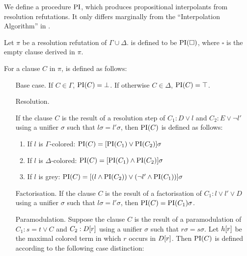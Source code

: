 We define a procedure $\operatorname{PI}$, which produces propositional interpolants from resolution refutations. It only differs marginally from the ``Interpolation Algorithm'' in \cite{Huang95}.
\begin{defi}
	Let $\pi$ be a resolution refutation of $\Gamma \cup \Delta$.
	 is defined to be $\operatorname{PI}(\square)$, where $\square$ is the empty clause derived in $\pi$.

	For a clause $C$ in $\pi$,  is defined as follows:
	\label{def:PI}
	\begin{itemize}
		\item[Base case.]
			If $C \in \Gamma$, $\operatorname{PI}(C) = \bot$.
			If otherwise $C \in \Delta$, $\operatorname{PI}(C) = \top$.
		\item[Resolution.]
			\label{def:PI_resolution}

      If the clause $C$ is the result of a resolution step of $C_1: D \lor l$ and $C_2: E \lor \lnot l'$ using a unifier $\sigma$ such that $l\sigma = l'\sigma$, then $\operatorname{PI}(C)$ is defined as follows:
      \begin{enumerate}
        \item If $l$ is $\Gamma$-colored: $\operatorname{PI}(C) = [\operatorname{PI}(C_1) \lor \operatorname{PI}(C_2)]\sigma$
        \item If $l$ is $\Delta$-colored: $\operatorname{PI}(C) = [\operatorname{PI}(C_1) \land \operatorname{PI}(C_2)]\sigma$
        \item If $l$ is grey: $\operatorname{PI}(C) = [(l \land \operatorname{PI}(C_2)) \lor (\lnot l' \land \operatorname{PI}(C_1)) ]\sigma $
      \end{enumerate}

    \item[Factorisation.]
      If the clause $C$ is the result of a factorisation of $C_1: l \lor l' \lor D$ using a unifier $\sigma$ such that $l\sigma = l'\sigma$, then $\operatorname{PI}(C) = \operatorname{PI}(C_1)\sigma$.

    \item[Paramodulation.]
  \label{def:PI_paramod}
      Suppose the clause $C$ is the result of a paramodulation of $C_1: s=t \lor C$ and $C_2: D[r]$ using a       unifier $\sigma$ such that $r\sigma = s\sigma$.
      Let $h[r]$ be the maximal colored term in which $r$ occurs in $D[r]$.
      Then $\operatorname{PI}(C)$ is defined according to the following case distinction:
      \begin{enumerate}


\end{enumerate}
\end{itemize}
\end{defi}
